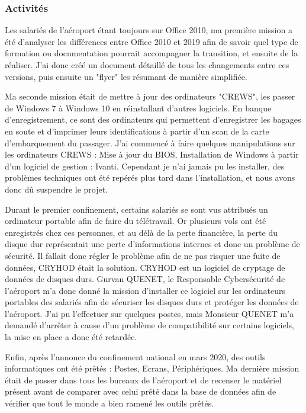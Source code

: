 \subsubsection*{Activités}

Les salariés de l'aéroport étant toujours sur Office 2010, ma première mission a été d'analyser les différences entre Office 2010 et 2019 afin de savoir quel type de formation ou documentation pourrait accompagner la transition, et ensuite de la réaliser.
J'ai donc créé un document détaillé de tous les changements entre ces versions, puis ensuite un "flyer" les résumant de manière simplifiée.\newline

Ma seconde mission était de mettre à jour des ordinateurs "CREWS", les passer de Windows 7 à Windows 10 en réinstallant d'autres logiciels. En banque d'enregistrement, ce sont des ordinateurs qui permettent d'enregistrer les bagages en soute et d'imprimer leurs identifications à partir d'un scan de la carte d'embarquement du passager.
J'ai commencé à faire quelques manipulations sur les ordinateurs CREWS : Mise à jour du BIOS, Installation de Windows à partir d'un logiciel de gestion : Ivanti.
Cependant je n'ai jamais pu les installer, des problèmes techniques ont été repérés plus tard dans l'installation, et nous avons donc dû suspendre le projet.\newline

Durant le premier confinement, certains salariés se sont vus attribués un ordinateur portable afin de faire du télétravail. Or plusieurs vols ont été enregistrés chez ces personnes, et au délà de la perte financière, la perte du disque dur représentait une perte d'informations internes et donc un problème de sécurité.
Il fallait donc régler le problème afin de ne pas risquer une fuite de données, CRYHOD était la solution. CRYHOD est un logiciel de cryptage de données de disques durs.
Gurvan QUENET, le Responsable Cybersécurité de l'aéroport m'a donc donné la mission d'installer ce logiciel sur les ordinateurs portables des salariés afin de sécuriser les disques durs et protéger les données de l'aéroport.
J'ai pu l'effectuer sur quelques postes, mais Monsieur QUENET m'a demandé d'arrêter à cause d'un problème de compatibilité sur certains logiciels, la mise en place a donc été retardée.\newline

Enfin, après l'annonce du confinement national en mars 2020, des outils informatiques ont été prêtés : Postes, Ecrans, Périphériques.
Ma dernière mission était de passer dans tous les bureaux de l'aéroport et de recenser le matériel présent avant de comparer avec celui prêté dans la base de données afin de vérifier que tout le monde a bien ramené les outils prêtés.

